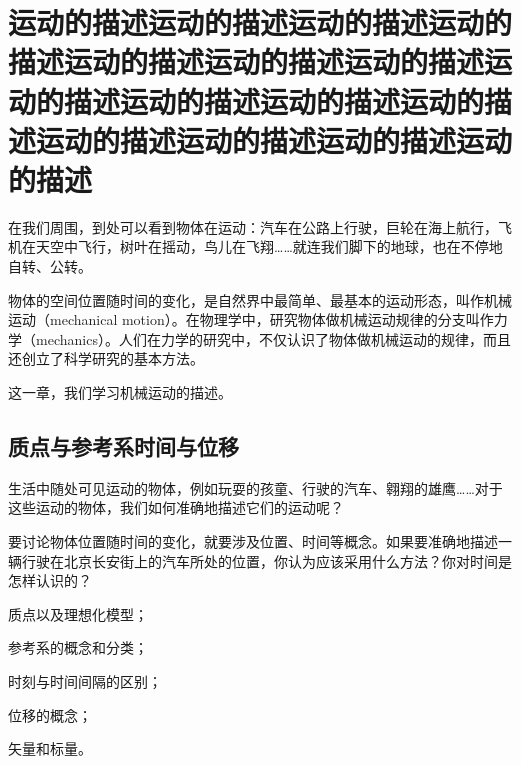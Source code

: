 



\chapter[运动的描述]{运动的描述运动的描述运动的描述运动的描述运动的描述运动的描述运动的描述运动的描述运动的描述运动的描述运动的描述运动的描述运动的描述运动的描述运动的描述}




	\begin{Block}%
		在我们周围，到处可以看到物体在运动：汽车在公路上行驶，巨轮在海上航行，飞机在天空中飞行，树叶在摇动，鸟儿在飞翔……就连我们脚下的地球，也在不停地自转、公转。
		
		物体的空间位置随时间的变化，是自然界中最简单、最基本的运动形态，叫作机械运动（mechanical motion）。在物理学中，研究物体做机械运动规律的分支叫作力学（mechanics）。人们在力学的研究中，不仅认识了物体做机械运动的规律，而且还创立了科学研究的基本方法。
		
		这一章，我们学习机械运动的描述。
	\end{Block}
	
	
	\begin{Proof}
		\zhlipsum
	\end{Proof}
	

	

\section{质点与参考系\quad 时间与位移}

	\begin{Point*}
		生活中随处可见运动的物体，例如玩耍的孩童、行驶的汽车、翱翔的雄鹰……对于这些运动的物体，我们如何准确地描述它们的运动呢？
		
		要讨论物体位置随时间的变化，就要涉及位置、时间等概念。如果要准确地描述一辆行驶在北京长安街上的汽车所处的位置，你认为应该采用什么方法？你对时间是怎样认识的？
		\begin{UnnumberedItem}[2][itemindent=2.0em]
			\item 质点以及理想化模型；
			\item 参考系的概念和分类；
			\item 时刻与时间间隔的区别；
			\item 位移的概念；
			\item 矢量和标量。
		\end{UnnumberedItem}
	\end{Point*}


